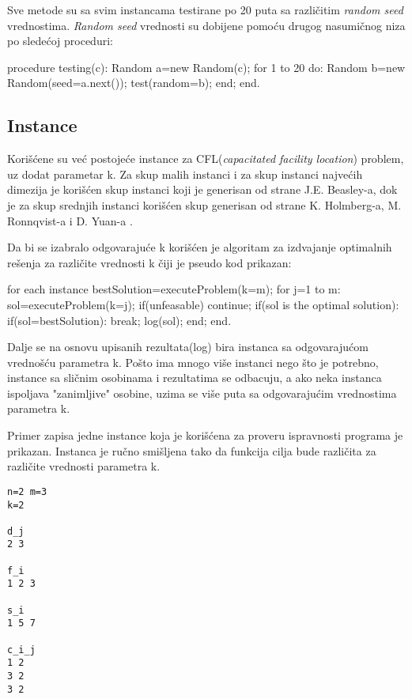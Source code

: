 \documentclass[a4paper]{article}
\begin{document}
Sve metode su sa svim instancama testirane po 20 puta sa različitim \emph{random seed} vrednostima. \emph{Random seed} vrednosti su dobijene pomoću drugog nasumičnog niza po sledećoj proceduri:

\begin{algorithm}
procedure testing(c):
	Random a=new Random(c);
	for 1 to 20 do:
		Random b=new Random(seed=a.next());
		test(random=b);
	end;
end.
\end{algorithm}

\subsection{Instance}
Korišćene su već postojeće instance za CFL(\emph{capacitated facility location}) problem, uz dodat parametar k. Za skup malih instanci i za skup instanci najvećih dimezija je korišćen skup instanci koji je generisan od strane J.E. Beasley-a\cite{beasley}, dok je za skup srednjih instanci korišćen skup generisan od strane K. Holmberg-a, M. Ronnqvist-a i D. Yuan-a \cite{holmberg}.

Da bi se izabralo odgovarajuće k korišćen je algoritam za izdvajanje optimalnih rešenja za različite vrednosti k čiji je pseudo kod prikazan:
\begin{algorithm}
for each instance
	bestSolution=executeProblem(k=m);
	for j=1 to m:
		sol=executeProblem(k=j);
		if(unfeasable)
			continue;
		if(sol is the optimal solution):
			if(sol=bestSolution):
				break;
			log(sol);
	end;
end.
\end{algorithm}

Dalje se na osnovu upisanih rezultata(log) bira instanca sa odgovarajućom vrednošću parametra k. Pošto ima mnogo više instanci nego što je potrebno, instance sa sličnim osobinama i rezultatima se odbacuju, a ako neka instanca ispoljava "zanimljive" osobine, uzima se više puta sa odgovarajućim vrednostima parametra k.

Primer zapisa jedne instance koja je korišćena za proveru ispravnosti programa je prikazan. Instanca je ručno smišljena tako da funkcija cilja bude različita za različite vrednosti parametra k.
\begin{lstlisting}
n=2 m=3
k=2

d_j
2 3

f_i
1 2 3

s_i
1 5 7

c_i_j
1 2 
3 2
3 2
\end{lstlisting}
\end{document}
